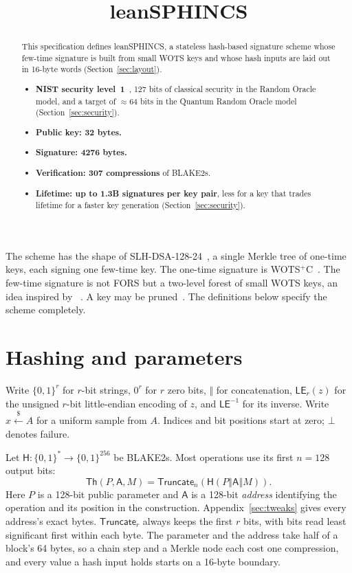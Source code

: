 \documentclass[11pt]{article}
\title{leanSPHINCS}
\author{}
\date{}
\theoremstyle{plain}
\theoremstyle{definition}
\newcommand{\bits}[1]{\{0,1\}^{#1}}
\newcommand{\getsr}{\stackrel{\$}{\gets}}
\newcommand{\Th}{\mathsf{Th}}
\newcommand{\hash}{\mathsf{H}}
\newcommand{\LE}{\mathsf{LE}}
\newcommand{\Truncate}{\mathsf{Truncate}}
\newcommand{\concat}{\mathbin\Vert}
\newcommand{\addr}{\mathsf{A}}
\begin{document}
\maketitle

\begin{abstract}

This specification defines leanSPHINCS, a stateless hash-based signature scheme whose few-time signature is built from small WOTS keys and whose hash inputs are laid out in 16-byte words (Section~\ref{sec:layout}).

\begin{itemize}
  \item \textbf{NIST security level~1}~\cite{NISTPQC}, 127 bits of classical security in the Random Oracle model, and a target of $\approx 64$ bits in the Quantum Random Oracle model (Section~\ref{sec:security}).
  \item \textbf{Public key: 32 bytes.}
  \item \textbf{Signature: 4276 bytes.}
  \item \textbf{Verification: 307 compressions} of BLAKE2s.
  \item \textbf{Lifetime: up to 1.3B signatures per key pair}, less for a key that trades lifetime for a faster key generation (Section~\ref{sec:security}).
\end{itemize}
\end{abstract}

The scheme has the shape of SLH-DSA-128-24~\cite{SP800230}, a single Merkle tree of one-time keys, each signing one few-time key. The one-time signature is WOTS$^+$C~\cite{HK22C}. The few-time signature is not FORS but a two-level forest of small WOTS keys, an idea inspired by ~\cite{siggolf}. A key may be pruned~\cite{conduition}. The definitions below specify the scheme completely.

\section{Hashing and parameters}
\label{sec:parameters}

Write $\bits r$ for $r$-bit strings, $0^r$ for $r$ zero bits, $\concat$ for concatenation, $\LE_r(z)$ for the unsigned $r$-bit little-endian encoding of $z$, and $\LE^{-1}$ for its inverse. Write $x\getsr A$ for a uniform sample from $A$. Indices and bit positions start at zero; $\bot$ denotes failure.

Let $\hash:\bits{*}\to\bits{256}$ be BLAKE2s. Most operations use its first $n=128$ output bits:
\[
  \Th(P,\addr,M)=\Truncate_n\!\left(\hash(P\concat\addr\concat M)\right).
\]
Here $P$ is a 128-bit public parameter and $\addr$ is a 128-bit \emph{address} identifying the operation and its position in the construction. Appendix~\ref{sec:tweaks} gives every address's exact bytes. $\Truncate_r$ always keeps the first $r$ bits, with bits read least significant first within each byte. The parameter and the address take half of a block's 64 bytes, so a chain step and a Merkle node each cost one compression, and every value a hash input holds starts on a 16-byte boundary.
\end{document}
